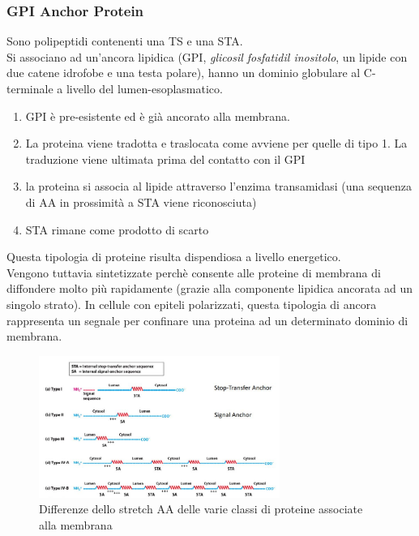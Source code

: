         \subsubsection{GPI Anchor Protein}
            Sono polipeptidi contenenti una TS e una STA.\\
            Si associano ad un'ancora lipidica (GPI, \textit{glicosil fosfatidil inositolo}, un lipide con due catene idrofobe e una testa polare), hanno un dominio globulare al C-terminale a livello del lumen-esoplasmatico.
            \begin{enumerate}
                \item GPI è pre-esistente ed è già ancorato alla membrana.
                \item La proteina viene tradotta e traslocata come avviene per quelle di tipo 1. La traduzione viene ultimata prima del contatto con il GPI
                \item la proteina si associa al lipide attraverso l'enzima transamidasi (una sequenza di AA in prossimità a STA viene riconosciuta)
                \item STA rimane come prodotto di scarto
            \end{enumerate}
            Questa tipologia di proteine risulta dispendiosa a livello energetico. \\
            Vengono tuttavia sintetizzate perchè consente alle proteine di membrana di diffondere molto più rapidamente (grazie alla componente lipidica ancorata ad un singolo strato). In cellule con epiteli polarizzati, questa tipologia di ancora rappresenta un segnale per confinare una proteina ad un determinato dominio di membrana.
            \begin{figure}[h]
                \centering
                \includegraphics[width=0.7\textwidth]{images/sequenzeTopogeniche.JPG}
                \caption{\small Differenze dello stretch AA delle varie classi di proteine associate alla membrana}
                \label{fig:mesh1}
            \end{figure}
\pagebreak
            

